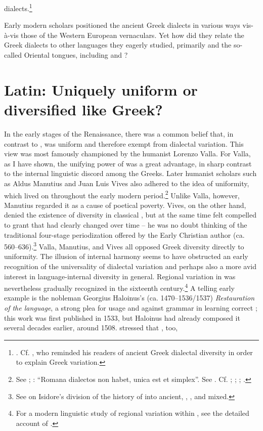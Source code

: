 dialects.\footnote{\citet[10]{Germano1622}. Cf. \citet[vi-vii]{Du1688}, who reminded his readers of ancient Greek dialectal diversity in order to explain  Greek variation.}

Early modern scholars positioned the ancient Greek dialects in various ways vis-à-vis those of the Western European vernaculars. Yet how did they relate the Greek dialects to other languages they eagerly studied, primarily  and the so-called Oriental tongues, including  and ?

\section{Latin: Uniquely uniform or diversified like Greek?}\label{sec:8.2}

In the early stages of the Renaissance, there was a common belief that, in contrast to ,  was uniform and therefore exempt from dialectal variation. This view was most famously championed by the  humanist Lorenzo Valla. For Valla, as I have shown, the unifying power of  was a great advantage, in sharp contrast to the internal linguistic discord among the Greeks. Later humanist scholars such as Aldus Manutius and Juan Luis Vives also adhered to the idea of  uniformity, which lived on throughout the early modern period.\footnote{See \citet[*.ii\textsc{\textsuperscript{v}}]{Manutius1496Aldus}; \citet[\textsc{x}.iii\textsc{\textsuperscript{v}}]{Vives1533}: “Romana dialectos non habet, unica est et simplex”. See \citet[11]{Trapp1990}. Cf. \citet[34--35]{Erasmus1528}; \citet[121]{Rapin1659}; \citet[29]{Wesley1736}; \citet[113--114]{Primatt1764}.} Unlike Valla, however, Manutius regarded it as a cause of poetical poverty. Vives, on the other hand, denied the existence of diversity in classical , but at the same time felt compelled to grant that  had clearly changed over time – he was no doubt thinking of the traditional four-stage periodization offered by the Early Christian author  (ca. 560–636).\footnote{See \citet[229--232]{Denecker2017} on Isidore’s division of the history of  into ancient, , , and mixed.} Valla, Manutius, and Vives all opposed Greek diversity directly to  uniformity. The illusion of  internal harmony seems to have obstructed an early recognition of the universality of dialectal variation and perhaps also a more avid interest in language-internal diversity in general. Regional variation in  was nevertheless gradually recognized in the sixteenth century.\footnote{For a modern linguistic study of regional variation within , see the detailed account of \citet{Adams2007}.} A telling early example is the  nobleman Georgius Haloinus’s (ca. 1470–1536/1537) \textit{Restauration of the  language}, a strong plea for usage and against grammar in learning correct ; this work was first published in 1533, but Haloinus had already composed it several decades earlier, around 1508. \citet[55]{Haloinus1978} stressed that , too, 